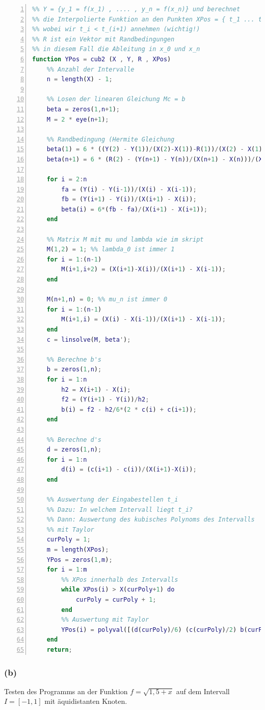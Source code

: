 \documentclass[11pt,a4paper,ngerman]{article}
\begin{document}
\begin{lstlisting}[basicstyle=\ttfamily\scriptsize\selectfont\upshape,language=matlab,numbers=left,]
%% Gibt ein Gitter X = {x_1, ..., x_n} vor mit Werten
%% Y = {y_1 = f(x_1) , .... , y_n = f(x_n)} und berechnet
%% die Interpolierte Funktion an den Punkten XPos = { t_1 ... t_m }
%% wobei wir t_i < t_(i+1) annehmen (wichtig!)
%% R ist ein Vektor mit Randbedingungen
%% in diesem Fall die Ableitung in x_0 und x_n
function YPos = cub2 (X , Y, R , XPos)
    %% Anzahl der Intervalle
    n = length(X) - 1;

    %% Losen der linearen Gleichung Mc = b
    beta = zeros(1,n+1);
    M = 2 * eye(n+1);
    
    %% Randbedingung (Hermite Gleichung
    beta(1) = 6 * ((Y(2) - Y(1))/(X(2)-X(1))-R(1))/(X(2) - X(1));
    beta(n+1) = 6 * (R(2) - (Y(n+1) - Y(n))/(X(n+1) - X(n)))/(X(n+1)-X(n));

    for i = 2:n
        fa = (Y(i) - Y(i-1))/(X(i) - X(i-1));
        fb = (Y(i+1) - Y(i))/(X(i+1) - X(i));
        beta(i) = 6*(fb - fa)/(X(i+1) - X(i+1));
    end

    %% Matrix M mit mu und lambda wie im skript
    M(1,2) = 1; %% lambda_0 ist immer 1
    for i = 1:(n-1)
        M(i+1,i+2) = (X(i+1)-X(i))/(X(i+1) - X(i-1));
    end

    M(n+1,n) = 0; %% mu_n ist immer 0
    for i = 1:(n-1)
        M(i+1,i) = (X(i) - X(i-1))/(X(i+1) - X(i-1));
    end
    c = linsolve(M, beta');
    
    %% Berechne b's
    b = zeros(1,n);
    for i = 1:n
        h2 = X(i+1) - X(i);
        f2 = (Y(i+1) - Y(i))/h2;
        b(i) = f2 - h2/6*(2 * c(i) + c(i+1));
    end

    %% Berechne d's
    d = zeros(1,n);
    for i = 1:n
        d(i) = (c(i+1) - c(i))/(X(i+1)-X(i));
    end
   
    %% Auswertung der Eingabestellen t_i
    %% Dazu: In welchem Intervall liegt t_i?
    %% Dann: Auswertung des kubisches Polynoms des Intervalls
    %% mit Taylor
    curPoly = 1;
    m = length(XPos);
    YPos = zeros(1,m);
    for i = 1:m
        %% XPos innerhalb des Intervalls
        while XPos(i) > X(curPoly+1) do
            curPoly = curPoly + 1;
        end
        %% Auswertung mit Taylor
        YPos(i) = polyval([(d(curPoly)/6) (c(curPoly)/2) b(curPoly) Y(curPoly)], (XPos(i) - X(curPoly)));
    end
    return;
\end{lstlisting}

\subsubsection*{(b)}
Testen des Programms an der Funktion $f = \sqrt{1,5 + x}$ auf dem Intervall $I = [-1,1]$
mit äquidistanten Knoten.\\
\end{document}
